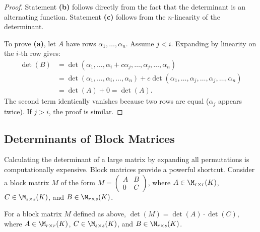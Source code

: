 \begin{proof}
  Statement \textbf{(b)} follows directly from the fact that the determinant is an alternating function. Statement \textbf{(c)} follows from the $n$-linearity of the determinant.

  To prove \textbf{(a)}, let $A$ have rows $\alpha_1, \dots, \alpha_n$. Assume $j < i$. Expanding by linearity on the $i$-th row gives:
  \begin{align*}
    \det(B) &= \det(\alpha_1, \dots, \alpha_i + c\alpha_j, \dots, \alpha_j, \dots, \alpha_n) \\
    &= \det(\alpha_1, \dots, \alpha_i, \dots, \alpha_n) + c \det(\alpha_1, \dots, \alpha_j, \dots, \alpha_j, \dots, \alpha_n) \\
    &= \det(A) + 0 = \det(A).
  \end{align*}
  The second term identically vanishes because two rows are equal ($\alpha_j$ appears twice). If $j > i$, the proof is similar.
\end{proof}

\subsection{Determinants of Block Matrices}

Calculating the determinant of a large matrix by expanding all permutations is computationally expensive. Block matrices provide a powerful shortcut. Consider a block matrix $M$ of the form $M = \left(\begin{smallmatrix} A & B \\ 0 & C \end{smallmatrix}\right)$, where $A \in \M_{r \times r}(K)$, $C \in \M_{s \times s}(K)$, and $B \in \M_{r \times s}(K)$.

\begin{proposition}
  \label{prop:block_matrix}
  For a block matrix $M$ defined as above, $\det(M) = \det(A) \cdot \det(C)$, where $A \in \M_{r \times r}(K)$, $C \in \M_{s \times s}(K)$, and $B \in \M_{r \times s}(K)$.
\end{proposition}

